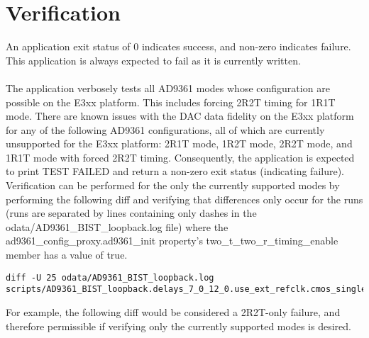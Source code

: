 \section{Verification}
An application exit status of 0 indicates success, and non-zero indicates failure. This application is always expected to fail as it is currently written. \\ \\
The application verbosely tests all AD9361 modes whose configuration are possible on the E3xx platform. This includes forcing 2R2T timing for 1R1T mode. There are known issues with the DAC data fidelity on the E3xx platform for any of the following AD9361 configurations, all of which are currently unsupported for the E3xx platform: 2R1T mode, 1R2T mode, 2R2T mode, and 1R1T mode with forced 2R2T timing. Consequently, the application is expected to print TEST FAILED and return a non-zero exit status (indicating failure). Verification can be performed for the only the currently supported modes by performing the following diff and verifying that differences only occur for the runs (runs are separated by lines containing only dashes in the odata/AD9361\_BIST\_loopback.log file) where the ad9361\_config\_proxy.ad9361\_init property's two\_t\_two\_r\_timing\_enable member has a value of true.
\begin{lstlisting}
diff -U 25 odata/AD9361_BIST_loopback.log scripts/AD9361_BIST_loopback.delays_7_0_12_0.use_ext_refclk.cmos_single_port_fdd.golden
\end{lstlisting}
For example, the following diff would be considered a 2R2T-only failure, and therefore permissible if verifying only the currently supported modes is desired.
